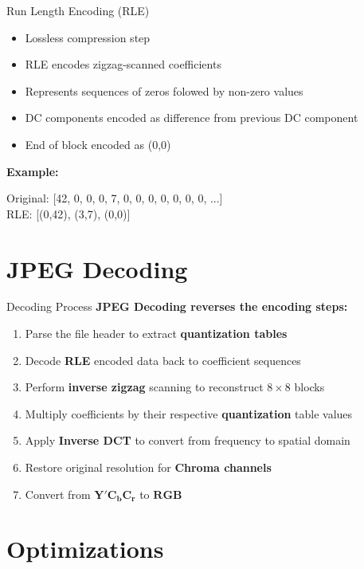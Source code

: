 \documentclass[10pt]{beamer}
\begin{document}
\begin{frame}{Run Length Encoding (RLE)}
    \begin{itemize}
     \item Lossless compression step
     \item RLE encodes zigzag-scanned coefficients
     \item Represents sequences of zeros folowed by non-zero values
     \item DC components encoded as difference from previous DC component
     \item End of block encoded as (0,0)
    \end{itemize}

    \vspace{0.5cm}
    \textbf{Example:}
    \begin{center}
     Original: [42, 0, 0, 0, 7, 0, 0, 0, 0, 0, 0, 0, ...]\\
     RLE: [(0,42), (3,7), (0,0)]
    \end{center}

\end{frame}


\section{JPEG Decoding}

\begin{frame}{Decoding Process}
    \textbf{JPEG Decoding reverses the encoding steps:}
    \begin{enumerate}
     \item Parse the file header to extract \textbf{quantization tables}
     \item Decode \textbf{RLE} encoded data back to coefficient sequences
     \item Perform \textbf{inverse zigzag} scanning to reconstruct $8\times8$ blocks
     \item Multiply coefficients by their respective \textbf{quantization} table values
     \item Apply \textbf{Inverse DCT} to convert from frequency to spatial domain
     \item Restore original resolution for \textbf{Chroma channels}
     \item Convert from $\bm{Y'C_bC_r}$ to $\bm{RGB}$
    \end{enumerate}

\end{frame}


\section{Optimizations}
\end{document}
